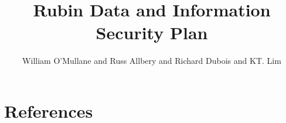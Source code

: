 \documentclass[OPS,lsstdeaft,authoryear,toc]{lsstdoc}
\title{Rubin Data and Information Security Plan}
\author{%
William O'Mullane and Russ Allbery and Richard Dubois and KT. Lim
}
\date{\vcsDate}
\begin{document}
\maketitle


\appendix
\section{References} \label{sec:bib}
\renewcommand{\refname}{} %


%
\printglossaries
\end{document}
